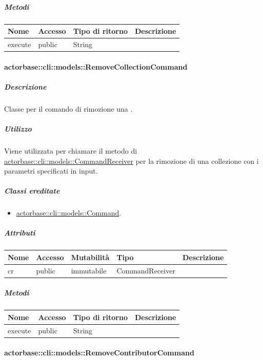 \documentclass{scalatekids-article}
\begin{document}
\subparagraph{Metodi}

\begin{tabular}{| l | l | l | l |}
  \hline
  Nome & Accesso & Tipo di ritorno & Descrizione\\
  \hline
  execute & public & String & \\
  \hline
\end{tabular}

\paragraph{actorbase::cli::models::RemoveCollectionCommand}
\label{sec:actorbase::cli::models::RemoveCollectionCommand}

\subparagraph{Descrizione}

Classe per il comando di rimozione una .

\subparagraph{Utilizzo}

Viene utilizzata per chiamare il metodo di
\hyperref[sec:actorbase::cli::models::CommandReceiver]{actorbase::cli::models::CommandReceiver} per la rimozione di una collezione con
i parametri specificati in input.

\subparagraph{Classi ereditate}

\begin{itemize}
\item \hyperref[sec:actorbase::cli::models::Command]{actorbase::cli::models::Command}.
\end{itemize}

\subparagraph{Attributi}

\begin{tabular}{| l | l | l | l | l |}
  \hline
  Nome & Accesso & Mutabilità & Tipo & Descrizione\\
  \hline
  cr & public & immutabile & CommandReceiver & \\
  \hline
\end{tabular}

\subparagraph{Metodi}

\begin{tabular}{| l | l | l | l |}
  \hline
  Nome & Accesso & Tipo di ritorno & Descrizione\\
  \hline
  execute & public & String & \\
  \hline
\end{tabular}

\paragraph{actorbase::cli::models::RemoveContributorCommand}
\label{sec:actorbase::cli::models::RemoveContributorCommand}
\end{document}
